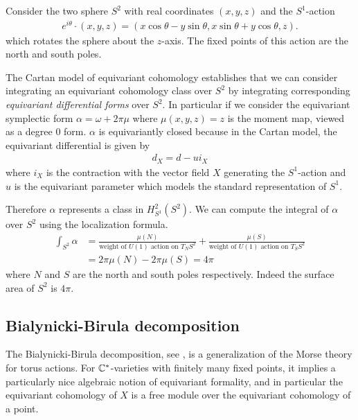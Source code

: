 \begin{example}
	Consider the two sphere $S^2$ with real coordinates $(x,y,z)$ and the $S^1$-action \begin{align*}
		e^{i\theta}\cdot(x,y,z) = (x\cos\theta - y\sin\theta, x\sin\theta + y\cos\theta, z).
	\end{align*}
	which rotates the sphere about the $z$-axis. The fixed points of this action are the north and south poles.

	The Cartan model of equivariant cohomology establishes that we can consider integrating an equivariant cohomology class over $S^2$ by integrating corresponding \emph{equivariant differential forms} over $S^2$. In particular if we consider the equivariant symplectic form $\alpha = \omega + 2\pi\mu$ where $\mu(x,y,z) = z$ is the moment map, viewed as a degree $0$ form. $\alpha$ is equivariantly closed because in the Cartan model, the equivariant differential is given by \begin{align*}
		d_X = d - ui_X
	\end{align*} where $i_X$ is the contraction with the vector field $X$ generating the $S^1$-action and $u$ is the equivariant parameter which models the standard representation of $S^1$.

	Therefore $\alpha$ represents a class in $H^2_{S^1}(S^2)$. We can compute the integral of $\alpha$ over $S^2$
	using the localization formula. \begin{align*}
		\int_{S^2} \alpha & = \frac{\mu(N)}{\text{weight of $U(1)$ action on $T_N S^2$}}
		+ \frac{\mu(S)}{\text{weight of $U(1)$ action on $T_S S^2$}}                     \\
		                  & = 2\pi\mu(N) - 2\pi\mu(S) = 4\pi
	\end{align*} where $N$ and $S$ are the north and south poles respectively. Indeed
	the surface area of $S^2$ is $4\pi$.
\end{example}

\subsection{Bialynicki-Birula decomposition}
The Bialynicki-Birula decomposition, see \cite{bb}, is a
generalization of the Morse theory for torus actions. For $\mathbb{C}^*$-varieties with finitely many fixed points, it implies a particularly nice algebraic notion of equivariant formality, and in particular the equivariant cohomology of $X$ is a free module over the equivariant cohomology of a point.

